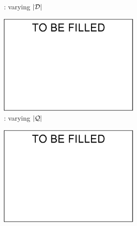 {\begin{figure}[tb!]
\begin{subfigure}[b]{1.00\textwidth}
\begin{subfigure}[b]{0.245\textwidth}
          \begin{center}
            \vspace{-2ex}\caption{\tpch: varying $|\mathcal D|$}
            \label{tpch-1-varyD} 
          \end{center}
          \vspace{-1ex}
        \end{subfigure}

        \begin{subfigure}[b]{0.245\textwidth}
			\centering
			\includegraphics[width=1\textwidth]{fig/a.eps}
			\begin{center}
				\vspace{-2ex}\caption{\tpcds: varying $|\mathcal Q|$}
				\label{tpcds-1-varyQ} 
			\end{center}
			\vspace{-1ex}
        \end{subfigure}
        \begin{subfigure}[b]{0.245\textwidth}
          \centering
          \includegraphics[width=1\textwidth]{fig/a.eps}

\end{subfigure}
\end{subfigure}
\end{figure}}
